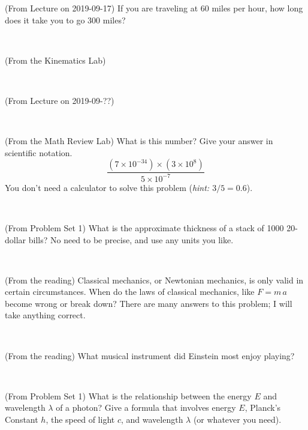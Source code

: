\documentclass[12pt, letterpaper]{article}
\begin{document}
\begin{problem} (From Lecture on 2019-09-17)
If you are traveling at 60 miles per hour, how long does
it take you to go 300 miles?
\end{problem}


\vfill ~

\begin{problem} (From the Kinematics Lab)

\end{problem}


\vfill ~

\begin{problem} (From Lecture on 2019-09-??)
\end{problem}


\vfill ~

\begin{problem} (From the Math Review Lab)
What is this number? Give your answer in scientific notation.
$$
\frac{(7\times10^{-34})\times(3\times10^8)}{5\times10^{-7}}
$$
You don't need a calculator to solve this problem (\textit{hint: $3/5=0.6$}).
\end{problem}


\vfill ~


\clearpage


\begin{problem} (From Problem Set 1)
What is the approximate thickness of a stack of 1000 20-dollar bills?
No need to be precise, and use any units you like.
\end{problem}


\vfill ~

\begin{problem} (From the reading)
Classical mechanics, or Newtonian mechanics, is only valid in certain
circumstances. When do the laws of classical mechanics, like $F =
m\,a$ become wrong or break down? There are many answers to this
problem; I will take anything correct.
\end{problem}


\vfill ~

\begin{problem} (From the reading)
What musical instrument did Einstein most enjoy playing?
\end{problem}


\vfill ~

\begin{problem} (From Problem Set 1)
What is the relationship between the energy $E$ and wavelength
$\lambda$ of a photon? Give a formula that involves energy $E$,
Planck's Constant $h$, the speed of light $c$, and wavelength
$\lambda$ (or whatever you need).
\end{problem}
\end{document}
